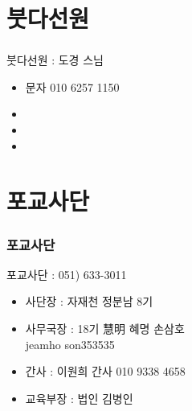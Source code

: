 \documentclass[aspectratio=1610,20pt,xcolor=pdftex,dvipsnames,table,handout]{beamer}
\begin{document}
		\section{붓다선원 }
		\begin{frame} [t,plain]
		\frametitle{ }
			\begin{block} {붓다선원 : 도경  스님 }
			\setlength{\leftmargini}{1em}			
			\begin{itemize}
				\item 문자 010 6257 1150
				\item 
				\item 
				\item 
			\end{itemize}
			\end{block}						

		\end{frame}						

		\begin{frame} [t,plain]
		\end{frame}						
		\begin{frame} [t,plain]
		\end{frame}						
		\begin{frame} [t,plain]
		\end{frame}						
			

		\section{포교사단 }

		\begin{frame} [t,plain]
		\frametitle{포교사단 }

			\begin{block} {포교사단  : 051) 633-3011 }
			\setlength{\leftmargini}{2em}			
			\begin{itemize}
				\item 사단장 :  자재천 정분남 8기 
				\item 사무국장 :  18기 慧明 혜명 손삼호  \\ jeamho son353535
				\item 간사 : 이원희 간사 010 9338 4658
				\item 교육부장 :  법인 김병인 \\ 
			\end{itemize}
			\end{block}						


		\end{frame}						
\end{document}
